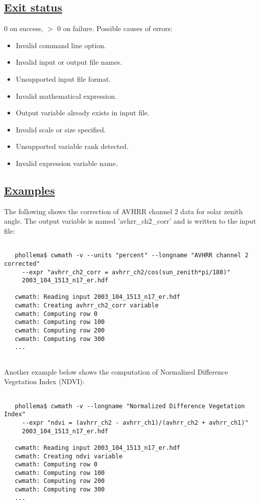 \subsection*{\underline{Exit status}}


  0 on success, $>$ 0 on failure. Possible causes of errors:
\begin{itemize}
\item  Invalid command line option. 
\item  Invalid input or output file names. 
\item  Unsupported input file format. 
\item  Invalid mathematical expression. 
\item  Output variable already exists in input file. 
\item  Invalid scale or size specified. 
\item  Unsupported variable rank detected. 
\item  Invalid expression variable name. 

\end{itemize}
\subsection*{\underline{Examples}}


  The following shows the correction of AVHRR channel 2 data for solar zenith angle. The output variable is named 'avhrr\_ch2\_corr' and is written to the input file:
\begin{verbatim}

   phollema$ cwmath -v --units "percent" --longname "AVHRR channel 2 corrected"
     --expr "avhrr_ch2_corr = avhrr_ch2/cos(sun_zenith*pi/180)" 
     2003_104_1513_n17_er.hdf

   cwmath: Reading input 2003_104_1513_n17_er.hdf
   cwmath: Creating avhrr_ch2_corr variable
   cwmath: Computing row 0
   cwmath: Computing row 100
   cwmath: Computing row 200
   cwmath: Computing row 300
   ...
 
\end{verbatim}


 Another example below shows the computation of Normalized Difference Vegetation Index (NDVI):
\begin{verbatim}

   phollema$ cwmath -v --longname "Normalized Difference Vegetation Index"
     --expr "ndvi = (avhrr_ch2 - avhrr_ch1)/(avhrr_ch2 + avhrr_ch1)" 
     2003_104_1513_n17_er.hdf

   cwmath: Reading input 2003_104_1513_n17_er.hdf
   cwmath: Creating ndvi variable
   cwmath: Computing row 0
   cwmath: Computing row 100
   cwmath: Computing row 200
   cwmath: Computing row 300
   ...
 
\end{verbatim}


